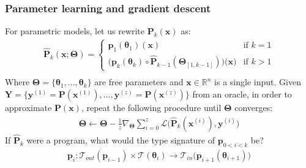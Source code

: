 \documentclass{beamer}
\begin{document}
    \begin{frame}
        \frametitle{Parameter learning and gradient descent}
        For parametric models, let us rewrite $\mathbf{P}_k(\mathbf{x})$ as:
        \begin{align*}
            \mathbf{\hat P}_k(\mathbf{x}; \mathbf{\boldsymbol\Theta}) = \begin{cases} \mathbf{p}_1(\boldsymbol\theta_1)(\mathbf{x}) &\text{if } k=1\\ \big(\mathbf{p}_k(\boldsymbol\theta_k)\circ \mathbf{\hat P}_{k-1}(\boldsymbol\Theta_{[1, k-1]})\big)\big(\mathbf{x}\big)&\text{if } k > 1 \end{cases} \\
        \end{align*}
        Where $\boldsymbol\Theta = \{\boldsymbol\theta_1, \dots, \boldsymbol\theta_k\}$ are free parameters and $\mathbf{x} \in \mathbb{R}^n$ is a single input. Given $\mathbf{Y} = \{\mathbf{y}^{(1)} = \mathbf{P}(\mathbf{x}^{(1)}), \dots, \mathbf{y}^{(z)} = \mathbf{P}(\mathbf{x}^{(z)})\}$ from an oracle, in order to approximate $\mathbf{P}(\mathbf x)$, repeat the following procedure until $\boldsymbol\Theta$ converges:
        \begin{align*}
            \boldsymbol\Theta \leftarrow \boldsymbol\Theta - \frac{1}{z}\nabla_{\boldsymbol\Theta} \sum_{i=0}^z\mathcal{L}\big(\mathbf{\hat P}_k(\mathbf{x}^{(i)}), \mathbf{y}^{(i)}\big)
        \end{align*}
        If $\mathbf{\hat P}_{k}$ were a program, what would the type signature of $\mathbf{p}_{0<i<k}$ be?
        \begin{align*}
            \mathbf{p}_i: \mathcal{T}_{out}(\mathbf{p}_{i-1}) \times \mathcal{T}(\boldsymbol\theta_{i}) \rightarrow \mathcal{T}_{in}\big(\mathbf{p}_{i+1}(\boldsymbol\theta_{i+1})\big)
        \end{align*}
    \end{frame}

\end{document}
